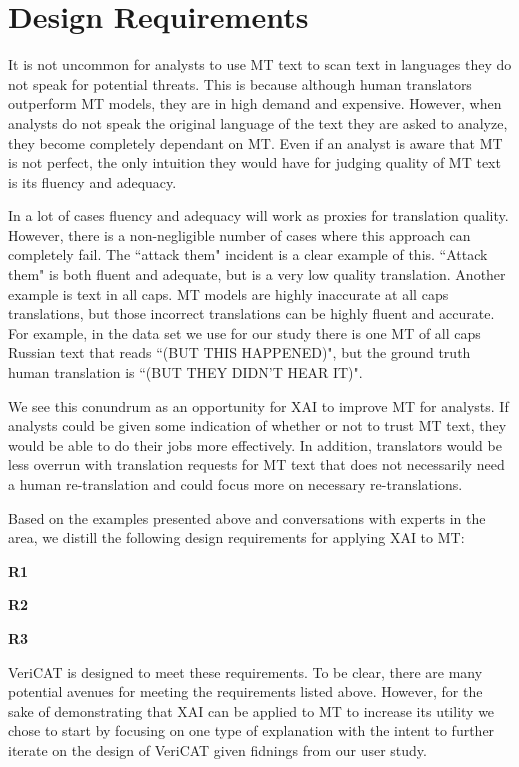 \section{Design Requirements}
\label{sec:design_requirements}

It is not uncommon for analysts to use MT text to scan text in languages they do not speak for potential threats. This is because although human translators outperform MT models, they are in high demand and expensive\cite{mauvcec2019machine}. However, when analysts do not speak the original language of the text they are asked to analyze, they become completely dependant on MT. Even if an analyst is aware that MT is not perfect, the only intuition they would have for judging quality of MT text is its fluency and adequacy. 

In a lot of cases fluency and adequacy will work as proxies for translation quality. However, there is a non-negligible number of cases where this approach can completely fail. The ``attack them" incident is a clear example of this. ``Attack them" is both fluent and adequate, but is a very low quality translation. Another example is text in all caps. MT models are highly inaccurate at all caps translations, but those incorrect translations can be highly fluent and accurate. For example, in the data set we use for our study there is one MT of all caps Russian text that reads ``(BUT THIS HAPPENED)", but the ground truth human translation is ``(BUT THEY DIDN'T HEAR IT)".       

We see this conundrum as an opportunity for XAI to improve MT for analysts. If analysts could be given some indication of whether or not to trust MT text, they would be able to do their jobs more effectively. In addition, translators would be less overrun with translation requests for MT text that does not necessarily need a human re-translation and could focus more on necessary re-translations.

Based on the examples presented above and conversations with experts in the area, we distill the following design requirements for applying XAI to MT: 

\begin{compacthang}
\item \textbf{R1}
\item \textbf{R2}
\item \textbf{R3} 
\end{compacthang}

VeriCAT is designed to meet these requirements. To be clear, there are many potential avenues for meeting the requirements listed above. However, for the sake of demonstrating that XAI can be applied to MT to increase its utility we chose to start by focusing on one type of explanation with the intent to further iterate on the design of VeriCAT given fidnings from our user study.    